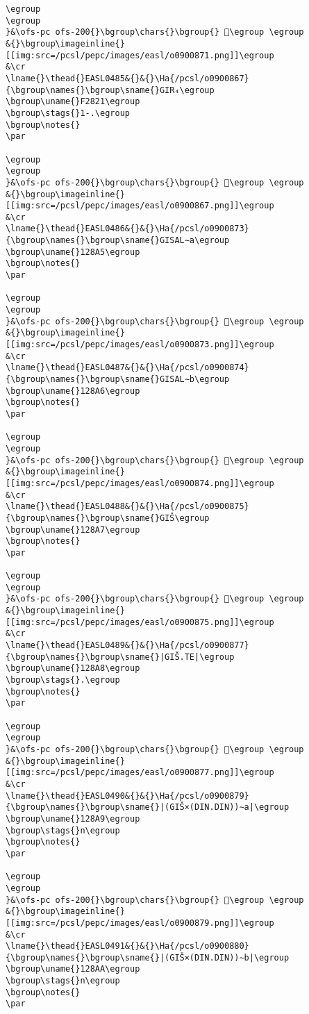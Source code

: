 \begin{verbatim}
\egroup
\egroup
}&\ofs-pc ofs-200{}\bgroup\chars{}\bgroup{} 𒢤\egroup \egroup
&{}\bgroup\imageinline{}[[img:src=/pcsl/pepc/images/easl/o0900871.png]]\egroup
&\cr
\lname{}\thead{}EASL0485&{}&{}\Ha{/pcsl/o0900867}{\bgroup\names{}\bgroup\sname{}GIR₄\egroup
\bgroup\uname{}F2821\egroup
\bgroup\stags{}1-.\egroup
\bgroup\notes{}
\par 

\egroup
\egroup
}&\ofs-pc ofs-200{}\bgroup\chars{}\bgroup{} 󲠡\egroup \egroup
&{}\bgroup\imageinline{}[[img:src=/pcsl/pepc/images/easl/o0900867.png]]\egroup
&\cr
\lname{}\thead{}EASL0486&{}&{}\Ha{/pcsl/o0900873}{\bgroup\names{}\bgroup\sname{}GISAL∼a\egroup
\bgroup\uname{}128A5\egroup
\bgroup\notes{}
\par 

\egroup
\egroup
}&\ofs-pc ofs-200{}\bgroup\chars{}\bgroup{} 𒢥\egroup \egroup
&{}\bgroup\imageinline{}[[img:src=/pcsl/pepc/images/easl/o0900873.png]]\egroup
&\cr
\lname{}\thead{}EASL0487&{}&{}\Ha{/pcsl/o0900874}{\bgroup\names{}\bgroup\sname{}GISAL∼b\egroup
\bgroup\uname{}128A6\egroup
\bgroup\notes{}
\par 

\egroup
\egroup
}&\ofs-pc ofs-200{}\bgroup\chars{}\bgroup{} 𒢦\egroup \egroup
&{}\bgroup\imageinline{}[[img:src=/pcsl/pepc/images/easl/o0900874.png]]\egroup
&\cr
\lname{}\thead{}EASL0488&{}&{}\Ha{/pcsl/o0900875}{\bgroup\names{}\bgroup\sname{}GIŠ\egroup
\bgroup\uname{}128A7\egroup
\bgroup\notes{}
\par 

\egroup
\egroup
}&\ofs-pc ofs-200{}\bgroup\chars{}\bgroup{} 𒢧\egroup \egroup
&{}\bgroup\imageinline{}[[img:src=/pcsl/pepc/images/easl/o0900875.png]]\egroup
&\cr
\lname{}\thead{}EASL0489&{}&{}\Ha{/pcsl/o0900877}{\bgroup\names{}\bgroup\sname{}|GIŠ.TE|\egroup
\bgroup\uname{}128A8\egroup
\bgroup\stags{}.\egroup
\bgroup\notes{}
\par 

\egroup
\egroup
}&\ofs-pc ofs-200{}\bgroup\chars{}\bgroup{} 𒢨\egroup \egroup
&{}\bgroup\imageinline{}[[img:src=/pcsl/pepc/images/easl/o0900877.png]]\egroup
&\cr
\lname{}\thead{}EASL0490&{}&{}\Ha{/pcsl/o0900879}{\bgroup\names{}\bgroup\sname{}|(GIŠ×(DIN.DIN))∼a|\egroup
\bgroup\uname{}128A9\egroup
\bgroup\stags{}n\egroup
\bgroup\notes{}
\par 

\egroup
\egroup
}&\ofs-pc ofs-200{}\bgroup\chars{}\bgroup{} 𒢩\egroup \egroup
&{}\bgroup\imageinline{}[[img:src=/pcsl/pepc/images/easl/o0900879.png]]\egroup
&\cr
\lname{}\thead{}EASL0491&{}&{}\Ha{/pcsl/o0900880}{\bgroup\names{}\bgroup\sname{}|(GIŠ×(DIN.DIN))∼b|\egroup
\bgroup\uname{}128AA\egroup
\bgroup\stags{}n\egroup
\bgroup\notes{}
\par 


\end{verbatim}
